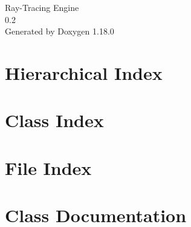 \documentclass[twoside]{book}
\newcommand{\+}{\discretionary{\mbox{\scriptsize$\hookleftarrow$}}{}{}}
\newcommand{\clearemptydoublepage}{%
    \newpage{\pagestyle{empty}\cleardoublepage}%
  }
\begin{document}
  \raggedbottom
    \hypersetup{pageanchor=false,
                bookmarksnumbered=true,
                pdfencoding=unicode
               }
  \begin{titlepage}
  \vspace*{7cm}
  \begin{center}%
  {\Large Ray-\/\+Tracing Engine}\\
  [1ex]\large 0.\+2 \\
  \vspace*{1cm}
  {\large Generated by Doxygen 1.18.0}\\
  \end{center}
  \end{titlepage}
  \clearemptydoublepage
  \tableofcontents
  \clearemptydoublepage
  \hypersetup{pageanchor=true}

\chapter{Hierarchical Index}

\chapter{Class Index}

\chapter{File Index}

\chapter{Class Documentation}



































\end{document}
